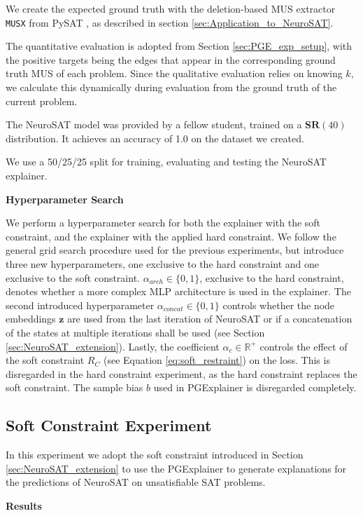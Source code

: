 We create the expected ground truth with the deletion-based MUS extractor \verb|MUSX| from PySAT \cite{imms-sat18}, as described in section \ref{sec:Application_to_NeuroSAT}.

The quantitative evaluation is adopted from Section \ref{sec:PGE_exp_setup}, with the positive targets being the edges that appear in the corresponding ground truth MUS of each problem. Since the qualitative evaluation relies on knowing $k$, we calculate this dynamically during evaluation from the ground truth of the current problem.

The NeuroSAT model was provided by a fellow student, trained on a $\textbf{SR}(40)$ distribution. It achieves an accuracy of 1.0 on the dataset we created.

We use a 50/25/25 split for training, evaluating and testing the NeuroSAT explainer. \bigskip

\textbf{Hyperparameter Search}\par
We perform a hyperparameter search for both the explainer with the soft constraint, and the explainer with the applied hard constraint. We follow the general grid search procedure used for the previous experiments, but introduce three new hyperparameters, one exclusive to the hard constraint and one exclusive to the soft constraint. $\alpha_{arch} \in \{0,1\}$, exclusive to the hard constraint, denotes whether a more complex MLP architecture is used in the explainer. The second introduced hyperparameter $\alpha_{concat} \in \{0,1\}$ controls whether the node embeddings $\mathbf{z}$ are used from the last iteration of NeuroSAT or if a concatenation of the states at multiple iterations shall be used (see Section \ref{sec:NeuroSAT_extension}). Lastly, the coefficient $\alpha_{c} \in \mathbb{R}^+$ controls the effect of the soft constraint $R_C$ (see Equation \ref{eq:soft_restraint}) on the loss. This is disregarded in the hard constraint experiment, as the hard constraint replaces the soft constraint. The sample bias $b$ used in PGExplainer is disregarded completely.


\subsection{Soft Constraint Experiment}
In this experiment we adopt the soft constraint introduced in Section \ref{sec:NeuroSAT_extension} to use the PGExplainer to generate explanations for the predictions of NeuroSAT on unsatisfiable SAT problems. \bigskip

\textbf{Results}\par


